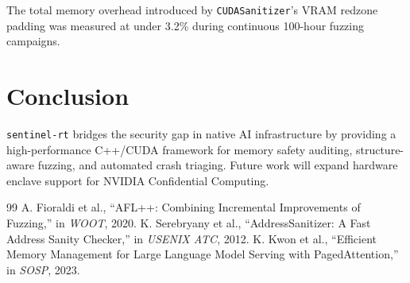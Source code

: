 \documentclass[10pt,twocolumn,a4paper]{article}
\begin{document}
The total memory overhead introduced by \texttt{CUDASanitizer}'s VRAM redzone padding was measured at under 3.2\% during continuous 100-hour fuzzing campaigns.

\section{Conclusion}
\texttt{sentinel-rt} bridges the security gap in native AI infrastructure by providing a high-performance C++/CUDA framework for memory safety auditing, structure-aware fuzzing, and automated crash triaging. Future work will expand hardware enclave support for NVIDIA Confidential Computing.

\begin{thebibliography}{99}
 A. Fioraldi et al., ``AFL++: Combining Incremental Improvements of Fuzzing,'' in \emph{WOOT}, 2020.
 K. Serebryany et al., ``AddressSanitizer: A Fast Address Sanity Checker,'' in \emph{USENIX ATC}, 2012.
 K. Kwon et al., ``Efficient Memory Management for Large Language Model Serving with PagedAttention,'' in \emph{SOSP}, 2023.
\end{thebibliography}
\end{document}
